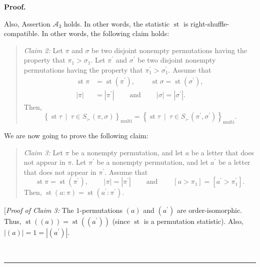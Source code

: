\documentclass[numbers=enddot,12pt,final,onecolumn,notitlepage]{scrartcl}%
\theoremstyle{definition}
\newenvironment{statement}{\begin{quote}}{\end{quote}}
\newenvironment{proof}[1][Proof]{\noindent\textbf{#1.} }{\ \rule{0.5em}{0.5em}}
\newenvironment{verlong}{}{}
\begin{document}
\begin{verlong}
\begin{proof}
\begin{statement}
\end{statement}

Also, Assertion $\mathcal{A}_{3}$ holds. In other words, the statistic
$\operatorname{st}$ is right-shuffle-compatible. In other words, the
following claim holds:

\begin{statement}
\textit{Claim 2:} Let $\pi$ and $\sigma$ be two disjoint nonempty permutations
having the property that $\pi_{1}>\sigma_{1}$. Let $\pi^{\prime}$ and
$\sigma^{\prime}$ be two disjoint nonempty permutations having the property
that $\pi_{1}^{\prime}>\sigma_{1}^{\prime}$. Assume that%
\begin{align*}
\operatorname{st} \pi    &  =\operatorname{st}\left(
\pi^{\prime}\right)  ,\ \ \ \ \ \ \ \ \ \ \operatorname{st} \sigma
=\operatorname{st}\left(  \sigma^{\prime}\right)  ,\\
\left\vert \pi\right\vert  &  =\left\vert \pi^{\prime}\right\vert
\ \ \ \ \ \ \ \ \ \ \text{and}\ \ \ \ \ \ \ \ \ \ \left\vert \sigma\right\vert
=\left\vert \sigma^{\prime}\right\vert .
\end{align*}
Then,
\[
\left\{  \operatorname{st} \tau   \ \mid\ \tau\in S_{\succ
}\left(  \pi,\sigma\right)  \right\}  _{\operatorname*{multi}}=\left\{
\operatorname{st} \tau   \ \mid\ \tau\in S_{\succ}\left(
\pi^{\prime},\sigma^{\prime}\right)  \right\}  _{\operatorname*{multi}}.
\]

\end{statement}

We are now going to prove the following claim:

\begin{statement}
\textit{Claim 3:} Let $\pi$ be a nonempty permutation, and let $a$ be a letter
that does not appear in $\pi$. Let $\pi^{\prime}$ be a nonempty permutation,
and let $a^{\prime}$ be a letter that does not appear in $\pi^{\prime}$.
Assume that%
\[
\operatorname{st} \pi   =\operatorname{st}\left(  \pi^{\prime
}\right)  ,\ \ \ \ \ \ \ \ \ \ \left\vert \pi\right\vert =\left\vert
\pi^{\prime}\right\vert \ \ \ \ \ \ \ \ \ \ \text{and}%
\ \ \ \ \ \ \ \ \ \ \left[  a>\pi_{1}\right]  =\left[  a^{\prime}>\pi
_{1}^{\prime}\right]  .
\]
Then, $\operatorname{st}\left(  a:\pi\right)  =\operatorname{st}\left(
a^{\prime}:\pi^{\prime}\right)  $.
\end{statement}

[\textit{Proof of Claim 3:} The $1$-permutations $\left(  a\right)  $ and
$\left(  a^{\prime}\right)  $ are order-isomorphic. Thus, $\operatorname{st}
\left(  \left(  a\right)  \right)  =\operatorname{st}\left(  \left(
a^{\prime}\right)  \right)  $ (since $\operatorname{st}$ is a permutation
statistic). Also, $\left\vert \left(  a\right)  \right\vert =1=\left\vert
\left(  a^{\prime}\right)  \right\vert $.


\end{proof}
\end{verlong}
\end{document}
